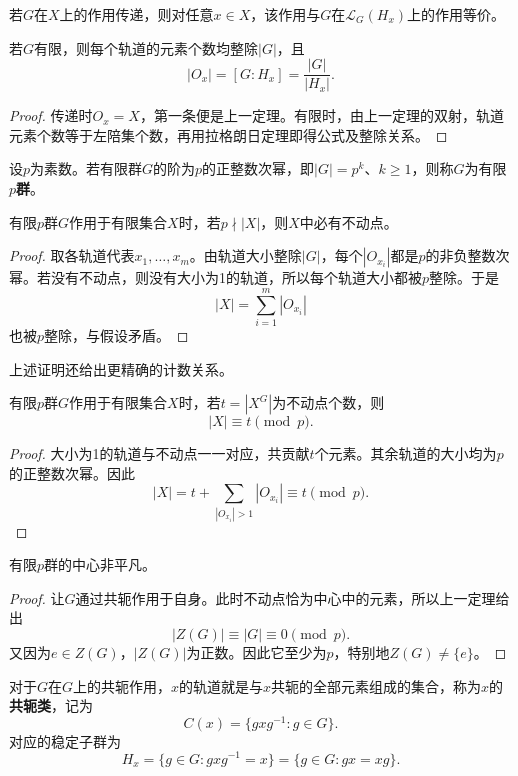 \begin{corollary}
若$G$在$X$上的作用传递，则对任意$x\in X$，该作用与$G$在$\mathcal L_G(H_x)$上的作用等价。


若$G$有限，则每个轨道的元素个数均整除$|G|$，且
\[
|O_x|=[G:H_x]=\frac{|G|}{|H_x|}.
\]
\end{corollary}
\begin{proof}
传递时$O_x=X$，第一条便是上一定理。有限时，由上一定理的双射，轨道元素个数等于左陪集个数，再用拉格朗日定理即得公式及整除关系。
\end{proof}

\begin{definition}
\label{p2:concept:c2-l1111}设$p$为素数。若有限群$G$的阶为$p$的正整数次幂，即$|G|=p^k$、$k\geq1$，则称$G$为有限\textbf{$p$群}。
\end{definition}

\begin{corollary}
有限$p$群$G$作用于有限集合$X$时，若$p\nmid|X|$，则$X$中必有不动点。
\end{corollary}
\begin{proof}
取各轨道代表$x_1,\ldots,x_m$。由轨道大小整除$|G|$，每个$|O_{x_i}|$都是$p$的非负整数次幂。若没有不动点，则没有大小为1的轨道，所以每个轨道大小都被$p$整除。于是
\[
|X|=\sum_{i=1}^m|O_{x_i}|
\]
也被$p$整除，与假设矛盾。
\end{proof}

上述证明还给出更精确的计数关系。

\begin{theorem}\label{p2:p-fixed}
有限$p$群$G$作用于有限集合$X$时，若$t=|X^G|$为不动点个数，则
\[
|X|\equiv t\pmod p.
\]
\end{theorem}
\begin{proof}
大小为1的轨道与不动点一一对应，共贡献$t$个元素。其余轨道的大小均为$p$的正整数次幂。因此
\[
|X|=t+\sum_{|O_{x_i}|>1}|O_{x_i}|\equiv t\pmod p.
\]
\end{proof}

\begin{corollary}
有限$p$群的中心非平凡。
\end{corollary}
\begin{proof}
让$G$通过共轭作用于自身。此时不动点恰为中心中的元素，所以上一定理给出
\[
|Z(G)|\equiv|G|\equiv0\pmod p.
\]
又因为$e\in Z(G)$，$|Z(G)|$为正数。因此它至少为$p$，特别地$Z(G)\ne\{e\}$。
\end{proof}

\label{p2:concept:c2-l1151}对于$G$在$G$上的共轭作用，$x$的轨道就是与$x$共轭的全部元素组成的集合，称为$x$的\textbf{共轭类}，记为
\[
C(x)=\{gxg^{-1}:g\in G\}.
\]
对应的稳定子群为
\[
H_x=\{g\in G:gxg^{-1}=x\}
=\{g\in G:gx=xg\}.
\]

